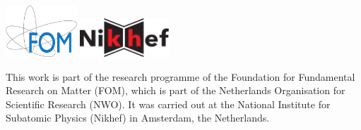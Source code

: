 \noindent%
\hspace*{0.05\textwidth}%
\href{http://www.fom.nl/}{\includegraphics[width=0.20\textwidth]{graphics/title/FOMlogo_fc-crop-cmyk}}%
%
\href{http://www.nikhef.nl/}{\includegraphics[width=0.25\textwidth]{graphics/title/NikhefLogoOutline_cmyk}}%
\hspace*{0.05\textwidth}\\
\vspace*{-0.02\textwidth}

\noindent This work is part of the research programme of the Foundation for Fundamental Research on Matter (FOM), which is part of the
Netherlands Organisation for Scientific Research (NWO). It was carried out at the National Institute for Subatomic Physics (Nikhef) in
Amsterdam, the Netherlands.

\newpage
\thispagestyle{empty}

